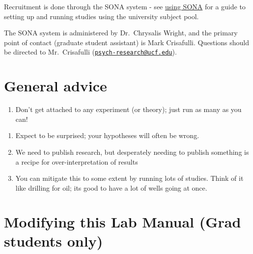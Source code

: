 \documentclass[
]{book}
\providecommand{\tightlist}{%
  \setlength{\itemsep}{0pt}\setlength{\parskip}{0pt}}
\begin{document}
Recruitment is done through the SONA system - see \href{docs/resources/SONA\%20Guide.pdf}{using SONA} for a guide to setting up and running studies using the university subject pool.

The SONA system is administered by Dr.~Chrysalis Wright, and the primary point of contact (graduate student assistant) is Mark Crisafulli. Questions should be directed to Mr.~Crisafulli (\href{mailto:psych-research@ucf.edu}{\nolinkurl{psych-research@ucf.edu}}).

\hypertarget{general-advice}{%
\section{General advice}\label{general-advice}}

\begin{enumerate}
\def\labelenumi{\arabic{enumi}.}
\tightlist
\item
  Don't get attached to any experiment (or theory); just run as many as you can!
\end{enumerate}

\begin{enumerate}
\def\labelenumi{\roman{enumi})}
\tightlist
\item
  Expect to be surprised; your hypotheses will often be wrong.
\item
  We need to publish research, but desperately needing to publish something is a recipe
  for over-interpretation of results
\item
  You can mitigate this to some extent by running lots of studies. Think of it like
  drilling for oil; its good to have a lot of wells going at once.
\end{enumerate}

\hypertarget{modifying-this-lab-manual-grad-students-only}{%
\section{Modifying this Lab Manual (Grad students only)}\label{modifying-this-lab-manual-grad-students-only}}
\end{document}
